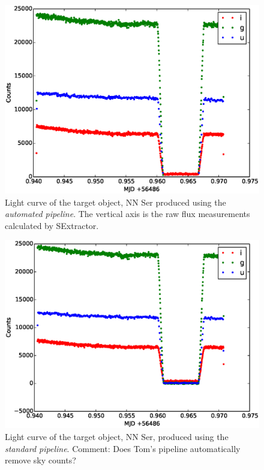 \begin{figure}[!h]
\centering
\includegraphics[width=140mm]{images/nnser_lightcurve_automated.eps}
\caption{Light curve of the target object, NN Ser produced using the \emph{automated pipeline}. The vertical axis is the raw flux measurements calculated by SExtractor.}
\label{fig:nnserlightcurveautomated}
\end{figure}

\begin{figure}[!h]
\centering
\includegraphics[width=140mm]{images/nnser_lightcurve_tom.eps}
\caption{Light curve of the target object, NN Ser, produced using the \emph{standard pipeline}. Comment: Does Tom's pipeline automatically remove sky counts?}
\label{fig:nnserlightcurvetom}
\end{figure}


